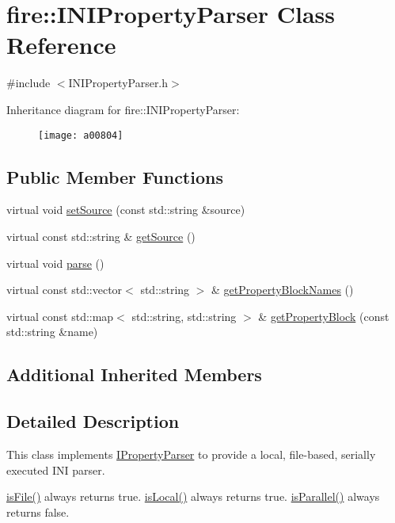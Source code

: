 \hypertarget{a00804}{}\section{fire\+:\+:I\+N\+I\+Property\+Parser Class Reference}
\label{a00804}


{\ttfamily \#include $<$I\+N\+I\+Property\+Parser.\+h$>$}

Inheritance diagram for fire\+:\+:I\+N\+I\+Property\+Parser\+:\begin{figure}[H]
\begin{center}
\leavevmode
\texttt{[image: a00804]}
\end{center}
\end{figure}
\subsection*{Public Member Functions}
\begin{DoxyCompactItemize}
\item 
virtual void \hyperlink{a00804_a06793909bc707a69d0c5772b14bc946d}{set\+Source} (const std\+::string \&source)
\item 
virtual const std\+::string \& \hyperlink{a00804_ad02c9a530f20a706d7bb2554813e8d3a}{get\+Source} ()
\item 
virtual void \hyperlink{a00804_a31b6bad01e65ed4bb5f1ba297616c641}{parse} ()
\item 
virtual const std\+::vector$<$ std\+::string $>$ \& \hyperlink{a00804_aed0f1f47111794659564dcddb4d25bc6}{get\+Property\+Block\+Names} ()
\item 
virtual const std\+::map$<$ std\+::string, std\+::string $>$ \& \hyperlink{a00804_a3591312590a66659ebd377cdde9ab9ad}{get\+Property\+Block} (const std\+::string \&name)
\end{DoxyCompactItemize}
\subsection*{Additional Inherited Members}


\subsection{Detailed Description}
This class implements \hyperlink{a00812}{I\+Property\+Parser} to provide a local, file-\/based, serially executed I\+NI parser.

\hyperlink{a00800_a091d5cf56bf8f407854ef87f460b2958}{is\+File()} always returns true. \hyperlink{a00800_a770acae6e216de3a9c7140a12de25d58}{is\+Local()} always returns true. \hyperlink{a00800_ad46898c516adcce38acbb4800dc9777b}{is\+Parallel()} always returns false.

